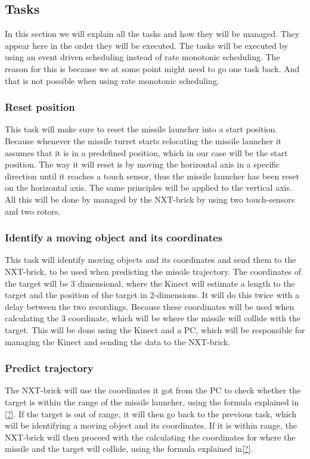 \subsection*{Tasks}
	In this section we will explain all the tasks and how they will be managed. They appear here in the order they will be executed. The tasks will be executed by using an event driven scheduling instead of rate monotonic scheduling. The reason for this is because we at some point might need to go one task back. And that is not possible when using rate monotonic scheduling.

\subsubsection{Reset position}
	This task will make sure to reset the missile launcher into a start position. Because whenever the missile turret starts relocating the missile launcher it assumes that it is in a predefined position, which in our case will be the start position. 
	The way it will reset is by moving the horizontal axis in a specific direction until it reaches a touch sensor, thus the missile launcher has been reset on the horizontal axis. The same principles will be applied to the vertical axis. All this will be done by managed by the NXT-brick by using two touch-sensors and two rotors.
	
\subsubsection{Identify a moving object and its coordinates}
	This task will identify moving objects and its coordinates and send them to the NXT-brick, to be used when predicting the missile trajectory.
	The coordinates of the target will be 3 dimensional, where the Kinect will estimate a length to the target and the position of the target in 2-dimensions. It will do this twice with a delay between the two recordings. Because these coordinates will be used when calculating the 3 coordinate, which will be where the missile will collide with the target.
	This will be done using the Kinect and a PC, which will be responsible for managing the Kinect and sending the data to the NXT-brick.
	
\subsubsection{Predict trajectory}
	The NXT-brick will use the coordinates it got from the PC to check whether the target is within the range of the missile launcher, using the formula explained in \ref{?}. If the target is out of range, it will then go back to the previous task, which will be identifying a moving object and its coordinates. If it is within range, the NXT-brick will then proceed with the calculating the coordinates for where the missile and the target will collide, using the formula explained in\ref{?}.
	

